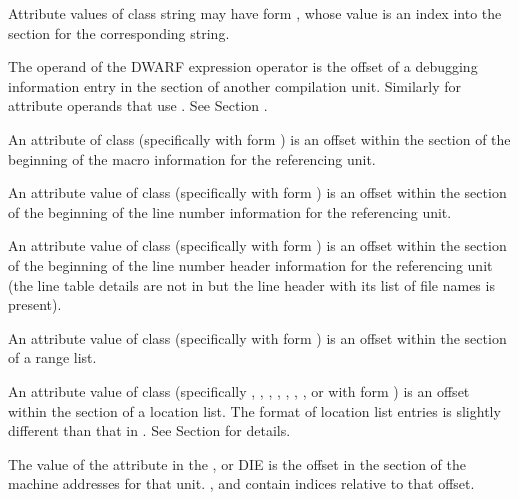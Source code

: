 \begin{description}
Attribute values of class string may have form 
\DWFORMstrx, whose value is an index into  the 
\dotdebugstroffsetsdwo{} section for the corresponding string.

The operand of the \DWOPcallref{} DWARF expression 
operator is the offset of a debugging 
information entry in the \dotdebuginfodwo{} section of 
another compilation unit.  Similarly for attribute 
operands that use \DWFORMrefaddr. 
See Section .

An attribute of class \CLASSmacptr{} (specifically \DWATmacros{} 
with form \DWFORMsecoffset{}) is an offset within the 
\dotdebugmacrodwo{} section of the beginning of the macro 
information for the referencing unit.

An attribute value of class \CLASSlineptr{} (specifically 
\DWATstmtlist{} with form \DWFORMsecoffset) 
is an offset within the \dotdebugline{} section of the 
beginning of the line number information for the 
referencing unit.

An attribute value of class \CLASSlineptr{} (specifically  
\DWATstmtlist{}  with form \DWFORMsecoffset) 
is an offset within the \dotdebuglinedwo{} section of the 
beginning of the line number header information 
for the referencing unit (the line table details are not in 
\dotdebuglinedwo{} but the line header with its list 
of file names is present).

An attribute value of class \CLASSrangelistptr{} 
(specifically \DWATranges{} with form 
\DWFORMsecoffset) is an offset within the \dotdebugranges{} 
section of a range list.

An attribute value of class \CLASSloclistptr{} (specifically 
\DWATdatamemberlocation,
\DWATframebase,
\DWATlocation, 
\DWATreturnaddr, 
\DWATsegment, 
\DWATstaticlink,
\DWATstringlength, 
\DWATuselocation{} or 
\DWATvtableelemlocation{}
with form \DWFORMsecoffset) is an offset within the 
\dotdebuglocdwo{} section of a location list.  The format of
\dotdebuglocdwo{} location list entries is slightly different 
than that in \dotdebugloc. 
See Section  for details.

The value of the \DWATaddrbase{} attribute in the 
\DWTAGcompileunit, \DWTAGpartialunit{} or \DWTAGtypeunit{} DIE 
is the offset in the \dotdebugaddr{} section of the machine 
addresses for that unit.
\DWFORMaddrx, \DWOPaddrx{} and \DWOPconstx{} contain indices 
relative to that offset.

\end{description}